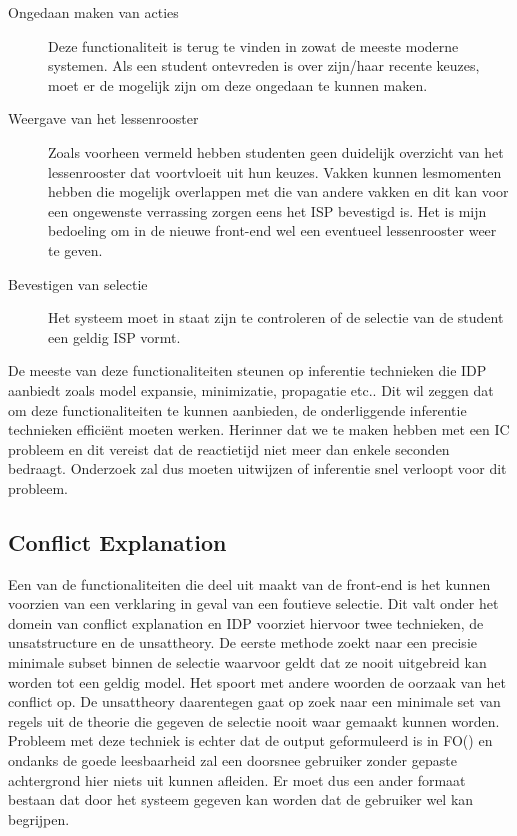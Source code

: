 \begin{description}
\item[Ongedaan maken van acties] Deze functionaliteit is terug te vinden in zowat de meeste moderne systemen. Als een student ontevreden is over zijn/haar recente keuzes, moet er de mogelijk zijn om deze ongedaan te kunnen maken. 
\item[Weergave van het lessenrooster] Zoals voorheen vermeld hebben studenten geen duidelijk overzicht van het lessenrooster dat voortvloeit uit hun keuzes. Vakken kunnen lesmomenten hebben die mogelijk overlappen met die van andere vakken en dit kan voor een ongewenste verrassing zorgen eens het ISP bevestigd is. Het is mijn bedoeling om in de nieuwe front-end wel een eventueel lessenrooster weer te geven.
\item[Bevestigen van selectie] Het systeem moet in staat zijn te controleren of de selectie van de student een geldig ISP vormt. 
\end{description}
De meeste van deze functionaliteiten steunen op inferentie technieken die IDP aanbiedt zoals model expansie, minimizatie, propagatie etc.. Dit wil zeggen dat om deze functionaliteiten te kunnen aanbieden, de onderliggende inferentie technieken effici\"{e}nt moeten werken. Herinner dat we te maken hebben met een IC probleem en dit vereist dat de reactietijd niet meer dan enkele seconden bedraagt. Onderzoek zal dus moeten uitwijzen of inferentie snel verloopt voor dit probleem.

\subsection{Conflict Explanation}
Een van de functionaliteiten die deel uit maakt van de front-end is het kunnen voorzien van een verklaring in geval van een foutieve selectie. Dit valt onder het domein van conflict explanation en IDP voorziet hiervoor twee technieken, de unsatstructure en de unsattheory. De eerste methode zoekt naar een precisie minimale subset binnen de selectie waarvoor geldt dat ze nooit uitgebreid kan worden tot een geldig model. Het spoort met andere woorden de oorzaak van het conflict op. De unsattheory daarentegen gaat op zoek naar een minimale set van regels uit de theorie die gegeven de selectie nooit waar gemaakt kunnen worden. Probleem met deze techniek is echter dat de output geformuleerd is in FO(\textperiodcentered) en ondanks de goede leesbaarheid zal een doorsnee gebruiker zonder gepaste achtergrond hier niets uit kunnen afleiden. Er moet dus een ander formaat bestaan dat door het systeem gegeven kan worden dat de gebruiker wel kan begrijpen. 

